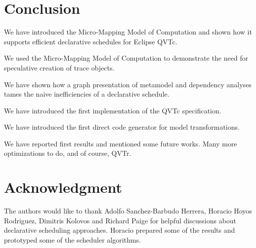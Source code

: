 \documentclass[conference]{IEEEtran}
\begin{document}




\section{Conclusion}\label{Conclusions}

We have introduced the Micro-Mapping Model of Computation and shown how it supports efficient declarative schedules for Eclipse QVTc.

We used the Micro-Mapping Model of Computation to demonstrate the need for speculative creation of trace objects.

We have shown how a graph presentation of metamodel and dependency analyses tames the naive inefficiencies of a declarative schedule.

We have introduced the first implementation of the QVTc specification.

We have introduced the first direct code generator for model transformations.

We have reported first results and mentioned some future works. Many more optimizations to do, and of course, QVTr.





\section*{Acknowledgment}

The authors would like to thank Adolfo Sanchez-Barbudo Herrera, Horacio Hoyos Rodriguez, Dimitris Kolovos and Richard Paige for helpful discussions about declarative scheduling approaches. Horacio prepared some of the results and prototyped some of the scheduler algorithms.

\end{document}
